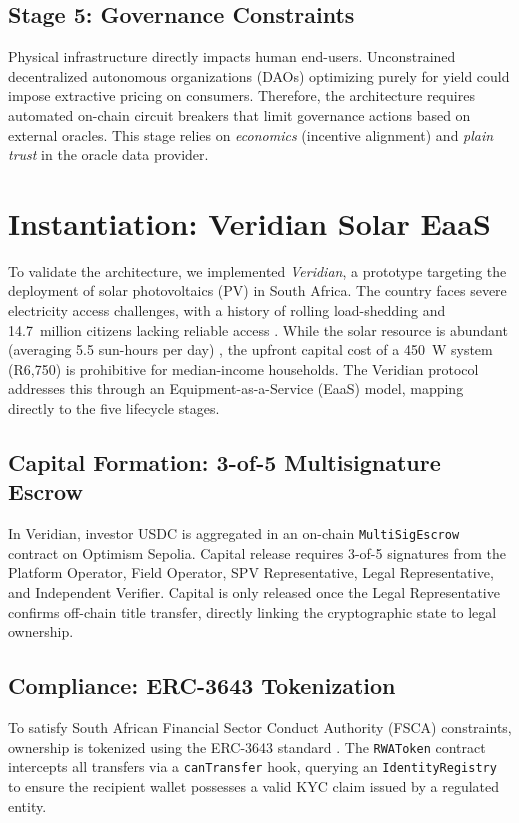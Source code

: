 \documentclass[conference]{IEEEtran}
\begin{document}
\subsection{Stage 5: Governance Constraints}
Physical infrastructure directly impacts human end-users. Unconstrained decentralized autonomous organizations (DAOs) optimizing purely for yield could impose extractive pricing on consumers. Therefore, the architecture requires automated on-chain circuit breakers that limit governance actions based on external oracles. This stage relies on \emph{economics} (incentive alignment) and \emph{plain trust} in the oracle data provider.

\section{Instantiation: Veridian Solar EaaS}
\label{sec:instantiation}

To validate the architecture, we implemented \emph{Veridian}, a prototype targeting the deployment of solar photovoltaics (PV) in South Africa. The country faces severe electricity access challenges, with a history of rolling load-shedding and 14.7~million citizens lacking reliable access \cite{nersa2023,worldbank2023}. While the solar resource is abundant (averaging 5.5 sun-hours per day) \cite{saws2023solar}, the upfront capital cost of a 450~W system (R6,750) is prohibitive for median-income households. The Veridian protocol addresses this through an Equipment-as-a-Service (EaaS) model, mapping directly to the five lifecycle stages.

\subsection{Capital Formation: 3-of-5 Multisignature Escrow}
In Veridian, investor USDC is aggregated in an on-chain \texttt{MultiSigEscrow} contract on Optimism Sepolia. Capital release requires 3-of-5 signatures from the Platform Operator, Field Operator, SPV Representative, Legal Representative, and Independent Verifier. Capital is only released once the Legal Representative confirms off-chain title transfer, directly linking the cryptographic state to legal ownership.

\subsection{Compliance: ERC-3643 Tokenization}
To satisfy South African Financial Sector Conduct Authority (FSCA) constraints, ownership is tokenized using the ERC-3643 standard \cite{erc3643}. The \texttt{RWAToken} contract intercepts all transfers via a \texttt{canTransfer} hook, querying an \texttt{IdentityRegistry} to ensure the recipient wallet possesses a valid KYC claim issued by a regulated entity.
\end{document}
